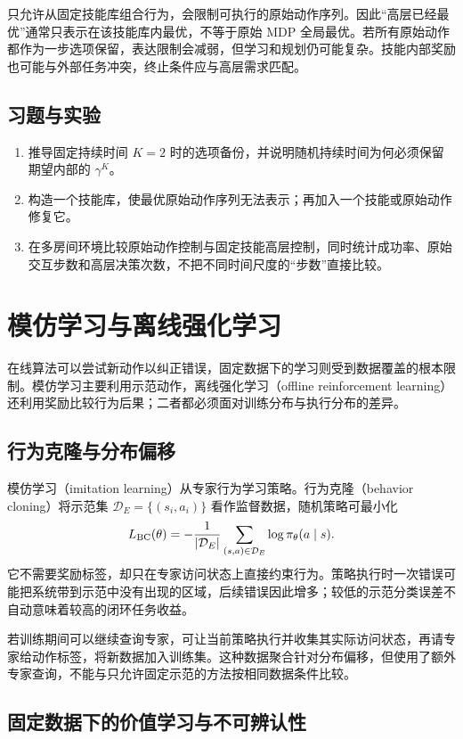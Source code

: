 \documentclass[UTF8,12pt,a4paper,fontset=fandol]{ctexbook}
\begin{document}
只允许从固定技能库组合行为，会限制可执行的原始动作序列。因此“高层已经最优”通常只表示在该技能库内最优，不等于原始 MDP 全局最优。若所有原始动作都作为一步选项保留，表达限制会减弱，但学习和规划仍可能复杂。技能内部奖励也可能与外部任务冲突，终止条件应与高层需求匹配。

\section{习题与实验}
\begin{enumerate}
\item 推导固定持续时间 $K=2$ 时的选项备份，并说明随机持续时间为何必须保留期望内部的 $\gamma^K$。
\item 构造一个技能库，使最优原始动作序列无法表示；再加入一个技能或原始动作修复它。
\item 在多房间环境比较原始动作控制与固定技能高层控制，同时统计成功率、原始交互步数和高层决策次数，不把不同时间尺度的“步数”直接比较。
\end{enumerate}

\chapter{模仿学习与离线强化学习}
\label{ch:rl-offline}

在线算法可以尝试新动作以纠正错误，固定数据下的学习则受到数据覆盖的根本限制。模仿学习主要利用示范动作，离线强化学习（offline reinforcement learning）还利用奖励比较行为后果；二者都必须面对训练分布与执行分布的差异\cite{levine-offline}。

\section{行为克隆与分布偏移}

模仿学习（imitation learning）从专家行为学习策略。行为克隆（behavior cloning）将示范集 $\mathcal D_E=\{(s_i,a_i)\}$ 看作监督数据，随机策略可最小化
\[
L_{\rm BC}(\theta)=-\frac1{|\mathcal D_E|}\sum_{(s,a)\in\mathcal D_E}\log\pi_\theta(a\mid s).
\]
它不需要奖励标签，却只在专家访问状态上直接约束行为。策略执行时一次错误可能把系统带到示范中没有出现的区域，后续错误因此增多；较低的示范分类误差不自动意味着较高的闭环任务收益。

若训练期间可以继续查询专家，可让当前策略执行并收集其实际访问状态，再请专家给动作标签，将新数据加入训练集。这种数据聚合针对分布偏移，但使用了额外专家查询，不能与只允许固定示范的方法按相同数据条件比较。

\section{固定数据下的价值学习与不可辨认性}
\end{document}
